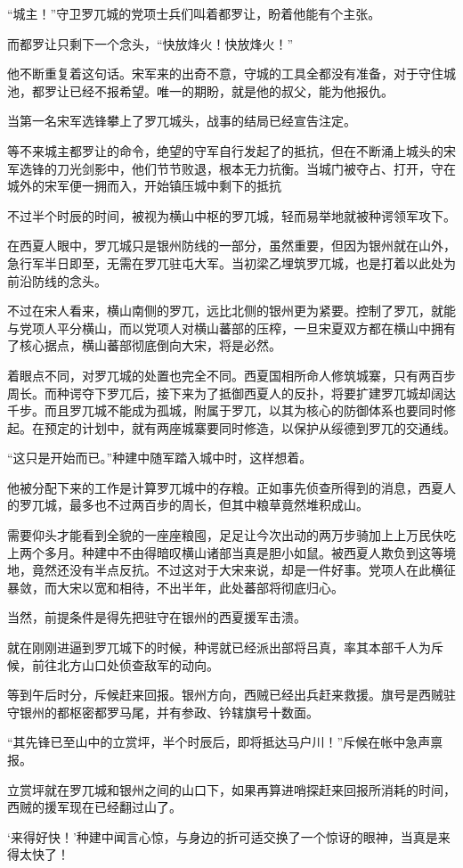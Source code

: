 “城主！”守卫罗兀城的党项士兵们叫着都罗让，盼着他能有个主张。

而都罗让只剩下一个念头，“快放烽火！快放烽火！”

他不断重复着这句话。宋军来的出奇不意，守城的工具全都没有准备，对于守住城池，都罗让已经不报希望。唯一的期盼，就是他的叔父，能为他报仇。

当第一名宋军选锋攀上了罗兀城头，战事的结局已经宣告注定。

等不来城主都罗让的命令，绝望的守军自行发起了的抵抗，但在不断涌上城头的宋军选锋的刀光剑影中，他们节节败退，根本无力抗衡。当城门被夺占、打开，守在城外的宋军便一拥而入，开始镇压城中剩下的抵抗

不过半个时辰的时间，被视为横山中枢的罗兀城，轻而易举地就被种谔领军攻下。

在西夏人眼中，罗兀城只是银州防线的一部分，虽然重要，但因为银州就在山外，急行军半日即至，无需在罗兀驻屯大军。当初梁乙埋筑罗兀城，也是打着以此处为前沿防线的念头。

不过在宋人看来，横山南侧的罗兀，远比北侧的银州更为紧要。控制了罗兀，就能与党项人平分横山，而以党项人对横山蕃部的压榨，一旦宋夏双方都在横山中拥有了核心据点，横山蕃部彻底倒向大宋，将是必然。

着眼点不同，对罗兀城的处置也完全不同。西夏国相所命人修筑城寨，只有两百步周长。而种谔夺下罗兀后，接下来为了抵御西夏人的反扑，将要扩建罗兀城却阔达千步。而且罗兀城不能成为孤城，附属于罗兀，以其为核心的防御体系也要同时修起。在预定的计划中，就有两座城寨要同时修造，以保护从绥德到罗兀的交通线。

“这只是开始而已。”种建中随军踏入城中时，这样想着。

他被分配下来的工作是计算罗兀城中的存粮。正如事先侦查所得到的消息，西夏人的罗兀城，最多也不过两百步的周长，但其中粮草竟然堆积成山。

需要仰头才能看到全貌的一座座粮囤，足足让今次出动的两万步骑加上上万民伕吃上两个多月。种建中不由得暗叹横山诸部当真是胆小如鼠。被西夏人欺负到这等境地，竟然还没有半点反抗。不过这对于大宋来说，却是一件好事。党项人在此横征暴敛，而大宋以宽和相待，不出半年，此处蕃部将彻底归心。

当然，前提条件是得先把驻守在银州的西夏援军击溃。

就在刚刚进逼到罗兀城下的时候，种谔就已经派出部将吕真，率其本部千人为斥候，前往北方山口处侦查敌军的动向。

等到午后时分，斥候赶来回报。银州方向，西贼已经出兵赶来救援。旗号是西贼驻守银州的都枢密都罗马尾，并有参政、钤辖旗号十数面。

“其先锋已至山中的立赏坪，半个时辰后，即将抵达马户川！”斥候在帐中急声禀报。

立赏坪就在罗兀城和银州之间的山口下，如果再算进哨探赶来回报所消耗的时间，西贼的援军现在已经翻过山了。

‘来得好快！’种建中闻言心惊，与身边的折可适交换了一个惊讶的眼神，当真是来得太快了！

